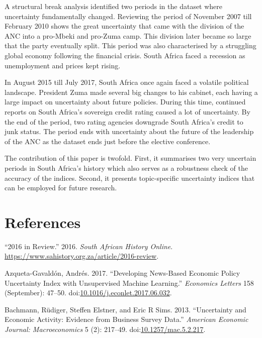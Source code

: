 \documentclass[11pt,preprint, authoryear]{elsarticle}
\numberwithin{equation}{section}
\numberwithin{figure}{section}
\numberwithin{table}{section}
\begin{document}
A structural break analysis identified two periods in the dataset where uncertainty fundamentally changed. Reviewing the period of November 2007 till February 2010 shows the great uncertainty that came with the division of the ANC into a pro-Mbeki and pro-Zuma camp. This division later became so large that the party eventually split. This period was also characterised by a struggling global economy following the financial crisis. South Africa faced a recession as unemployment and prices kept rising. 

In August 2015 till July 2017, South Africa once again faced a volatile political landscape. President Zuma made several big changes to his cabinet, each having a large impact on uncertainty about future policies. During this time, continued reports on South Africa's sovereign credit rating caused a lot of uncertainty. By the end of the period, two rating agencies downgrade South Africa's credit to junk status. The period ends with uncertainty about the future of the leadership of the ANC as the dataset ends just before the elective conference. 

The contribution of this paper is twofold. First, it summarises two very uncertain periods in South Africa's history which also serves as a robustness check of the accuracy of the indices. Second, it presents topic-specific uncertainty indices that can be employed for future research.

\newpage

\section*{References}\label{references}

\hypertarget{refs}{}
\hypertarget{ref-2016}{}
``2016 in Review.'' 2016. \emph{South African History Online}.
\url{https://www.sahistory.org.za/article/2016-review}.

\hypertarget{ref-Azqueta-Gavaldon2017}{}
Azqueta-Gavaldón, Andrés. 2017. ``Developing News-Based Economic Policy
Uncertainty Index with Unsupervised Machine Learning.'' \emph{Economics
Letters} 158 (September): 47--50.
doi:\href{https://doi.org/10.1016/j.econlet.2017.06.032}{10.1016/j.econlet.2017.06.032}.

\hypertarget{ref-Bachmann2013}{}
Bachmann, Rüdiger, Steffen Elstner, and Eric R Sims. 2013. ``Uncertainty
and Economic Activity: Evidence from Business Survey Data.''
\emph{American Economic Journal: Macroeconomics} 5 (2): 217--49.
doi:\href{https://doi.org/10.1257/mac.5.2.217}{10.1257/mac.5.2.217}.
\end{document}
